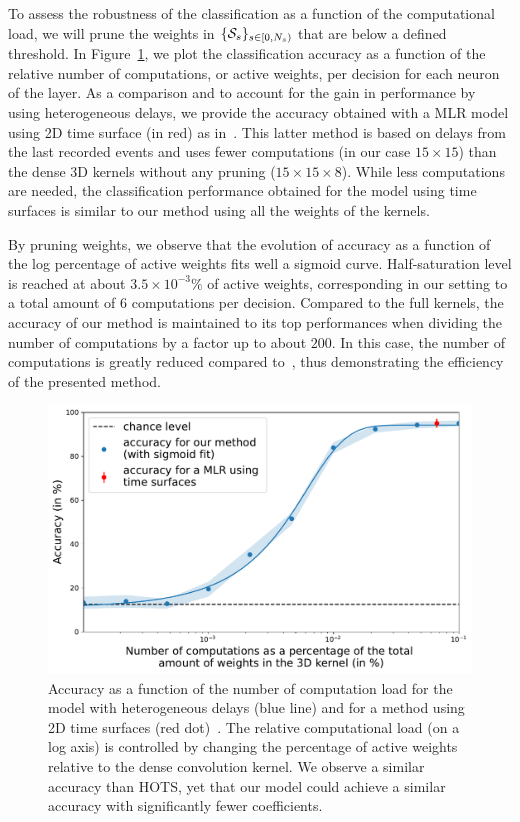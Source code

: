 \documentclass[default]{sn-jnl}%
\theoremstyle{thmstyleone}%
\theoremstyle{thmstyletwo}%
\theoremstyle{thmstylethree}%
\begin{document}
To assess the robustness of the classification as a function of the computational load, we will prune the weights in $\{\mathcal{S}_s\}_{s \in [0,N_{s})}$ that are below a defined threshold. In Figure~\ref{fig:accuracy}, we plot the classification accuracy as a function of the relative number of computations, or active weights, per decision for each neuron of the layer. As a comparison and to account for the gain in performance by using heterogeneous delays, we provide the accuracy obtained with a MLR model using 2D time surface (in red) as in~\citep{grimaldi_robust_2022}. This latter method is based on delays from the last recorded events and uses fewer computations (in our case $15\times15$) than the dense 3D kernels without any pruning ($15\times15\times8$). While less computations are needed, the classification performance obtained for the model using time surfaces is similar to our method using all the weights of the kernels.

By pruning weights, we observe that the evolution of accuracy as a function of the log percentage of active weights fits well a sigmoid curve. Half-saturation level is reached at about $3.5\times 10^{-3}\%$ of active weights, corresponding in our setting to a total amount of $6$ computations per decision. Compared to the full kernels, the accuracy of our method is maintained to its top performances when dividing the number of computations by a factor up to about $200$. In this case, the number of computations is greatly reduced compared to~\citep{grimaldi_robust_2022}, thus demonstrating the efficiency of the presented method. 

%
\begin{figure}%
    \centering
    \includegraphics[width=0.95\linewidth]{figures/accuracy.pdf}
    \caption{Accuracy as a function of the number of computation load for the model with heterogeneous delays (blue line) and for a method using 2D time surfaces (red dot)~\citep{grimaldi_robust_2022}. The relative computational load (on a log axis) is controlled by changing the percentage of active weights relative to the dense convolution kernel. We observe a similar accuracy than HOTS, yet that our model could achieve a similar accuracy with significantly fewer coefficients.}
    \label{fig:accuracy}
\end{figure}
\end{document}
